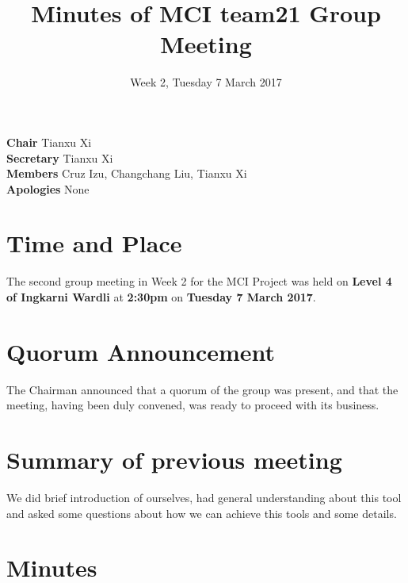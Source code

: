 \documentclass[11pt, a4paper]{article}
\begin{document}
\title{Minutes of MCI team21 Group Meeting}
\date{Week 2, Tuesday 7 March 2017}
\maketitle

\vspace*{15pt}

\begin{center}
\begin{flushleft}
  \textbf{Chair}      \qquad Tianxu Xi\\
  \textbf{Secretary}  \qquad Tianxu Xi\\
  \textbf{Members}    \qquad Cruz Izu, Changchang Liu, Tianxu Xi\\
  \textbf{Apologies}  \qquad None \\
\end{flushleft}
\end{center}




\vspace*{10pt}

\section{Time and Place}
The second group meeting in Week 2 for the MCI Project was held on \textbf{Level 4 of Ingkarni Wardli} at \textbf{2:30pm} on \textbf{Tuesday 7 March 2017}. \\
 
\section{Quorum Announcement}

The Chairman announced that a quorum of the group was present, and that the
meeting, having been duly convened, was ready to proceed with its business.

\section{ Summary of previous meeting}

We did brief introduction of ourselves, had general understanding about this tool and asked some questions about how we can achieve this tools and some details.  

\section{Minutes}
\end{document}
